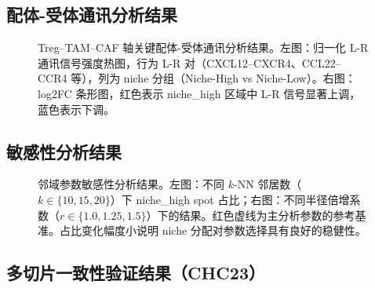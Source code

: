 \documentclass[12pt, a4paper]{ctexart}
\begin{document}
\subsection{配体-受体通讯分析结果}

\begin{figure}[H]
\centering
\caption{Treg--TAM--CAF 轴关键配体-受体通讯分析结果。左图：归一化 L-R 通讯信号强度热图，行为 L-R 对（CXCL12--CXCR4、CCL22--CCR4 等），列为 niche 分组（Niche-High vs Niche-Low）。右图：log2FC 条形图，红色表示 niche\_high 区域中 L-R 信号显著上调，蓝色表示下调。}
\label{fig:lr_communication}
\end{figure}

\subsection{敏感性分析结果}

\begin{figure}[H]
\centering
\caption{邻域参数敏感性分析结果。左图：不同 $k$-NN 邻居数（$k \in \{10, 15, 20\}$）下 niche\_high spot 占比；右图：不同半径倍增系数（$r \in \{1.0, 1.25, 1.5\}$）下的结果。红色虚线为主分析参数的参考基准。占比变化幅度小说明 niche 分配对参数选择具有良好的稳健性。}
\label{fig:sensitivity}
\end{figure}

\subsection{多切片一致性验证结果（CHC23）}
\end{document}
